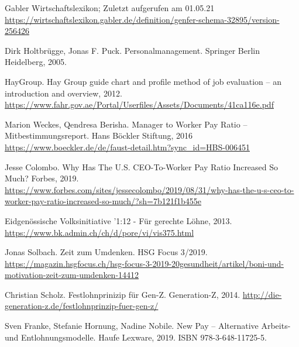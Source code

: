 \documentclass[11pt,a4paper]{article}
\begin{document}
\begin{thebibliography}{xxx}
 Gabler Wirtschaftslexikon; Zuletzt aufgerufen am 01.05.21
  \url{https://wirtschaftslexikon.gabler.de/definition/genfer-schema-32895/version-256426}

 Dirk Holtbrügge, Jonas F. Puck. Personalmanagement.  Springer
  Berlin Heidelberg, 2005.

 HayGroup. Hay Group guide chart and profile method of job
  evaluation -- an introduction and overview, 2012.
  \url{https://www.fahr.gov.ae/Portal/Userfiles/Assets/Documents/41ca116e.pdf}

 Marion Weckes, Qendresa Berisha. Manager to Worker Pay Ratio --
  Mitbestimmungsreport. Hans Böckler Stiftung, 2016
  \url{https://www.boeckler.de/de/faust-detail.htm?sync_id=HBS-006451}

 Jesse Colombo. Why Has The U.S. CEO-To-Worker Pay Ratio
  Increased So Much? Forbes, 2019.
  \url{https://www.forbes.com/sites/jessecolombo/2019/08/31/why-has-the-u-s-ceo-to-worker-pay-ratio-increased-so-much/?sh=7b121f1b455e}

 Eidgenössische Volksinitiative '1:12 - Für gerechte Löhne, 2013.
  \url{https://www.bk.admin.ch/ch/d/pore/vi/vis375.html}

 Jonas Solbach. Zeit zum Umdenken.  HSG Focus 3/2019.
  \url{https://magazin.hsgfocus.ch/hsg-focus-3-2019-20gesundheit/artikel/boni-und-motivation-zeit-zum-umdenken-14412}

 Christian Scholz. Festlohnprinizip für Gen-Z. Generation-Z,
  2014.  \url{http://die-generation-z.de/festlohnprinzip-fuer-gen-z/}

 Sven Franke, Stefanie Hornung, Nadine Nobile. New Pay --
  Alternative Arbeits- und Entlohnungsmodelle. Haufe Lexware, 2019. ISBN
  978-3-648-11725-5.
\end{thebibliography}
\end{document}
